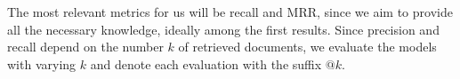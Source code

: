 The most relevant metrics for us will be recall and MRR, since we aim to provide all the necessary knowledge, ideally among the first results.
Since precision and recall depend on the number $k$ of retrieved documents, we evaluate the models with varying $k$ and denote each evaluation with the suffix $\text{@}k$.